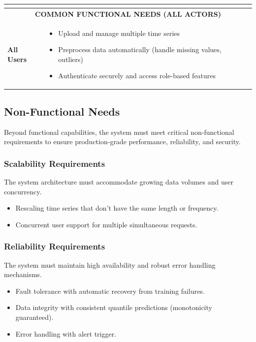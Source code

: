 \begin{table}[H]
\begin{tabular}{|p{7cm}|p{9cm}|}
\begin{itemize}[leftmargin=*, nosep, topsep=2pt, partopsep=0pt]
\end{itemize} \\
\hline
\multicolumn{2}{|c|}{\textbf{COMMON FUNCTIONAL NEEDS (ALL ACTORS)}} \\
\hline
\textbf{All Users} &
\begin{itemize}[leftmargin=*, nosep, topsep=2pt, partopsep=0pt]
  \item Upload and manage multiple time series
  \item Preprocess data automatically (handle missing values, outliers)
  \item Authenticate securely and access role-based features
\end{itemize} \\
\hline
\end{tabular}
\end{table}

\subsection{Non-Functional Needs}
\label{subsec:nonfunc_req}

Beyond functional capabilities, the system must meet critical non-functional requirements to ensure production-grade performance, reliability, and security.
\subsubsection{Scalability Requirements}
The system architecture must accommodate growing data volumes and user concurrency.
\begin{itemize}
    \item Rescaling time series that don’t have the same length or frequency.
    \item Concurrent user support for multiple simultaneous requests.
\end{itemize}

\subsubsection{Reliability Requirements}
The system must maintain high availability and robust error handling mechanisms.
\begin{itemize}  
    \item Fault tolerance with automatic recovery from training failures.
    \item Data integrity with consistent quantile predictions (monotonicity guaranteed).
    \item Error handling with alert trigger.
\end{itemize}

